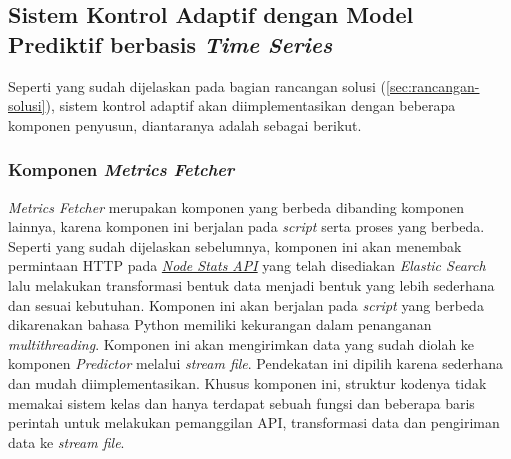 \subsection{Sistem Kontrol Adaptif dengan Model Prediktif berbasis \textit{Time Series}}

Seperti yang sudah dijelaskan pada bagian rancangan solusi (\ref{sec:rancangan-solusi}), sistem kontrol adaptif akan diimplementasikan dengan beberapa komponen penyusun, diantaranya adalah sebagai berikut.

\subsubsection{Komponen \textit{Metrics Fetcher}}
\textit{Metrics Fetcher} merupakan komponen yang berbeda dibanding komponen lainnya, karena komponen ini berjalan pada \textit{script} serta proses yang berbeda. Seperti yang sudah dijelaskan sebelumnya, komponen ini akan menembak permintaan HTTP pada \href{https://www.elastic.co/guide/en/elasticsearch/reference/current/cluster-nodes-stats.html}{\textit{Node Stats API}} yang telah disediakan \textit{Elastic Search} lalu melakukan transformasi bentuk data menjadi bentuk yang lebih sederhana dan sesuai kebutuhan. Komponen ini akan berjalan pada \textit{script} yang berbeda dikarenakan bahasa Python memiliki kekurangan dalam penanganan \textit{multithreading}. Komponen ini akan mengirimkan data yang sudah diolah ke komponen \textit{Predictor} melalui \textit{stream file}. Pendekatan ini dipilih karena sederhana dan mudah diimplementasikan. Khusus komponen ini, struktur kodenya tidak memakai sistem kelas dan hanya terdapat sebuah fungsi dan beberapa baris perintah untuk melakukan pemanggilan API, transformasi data dan pengiriman data ke \textit{stream file}.

